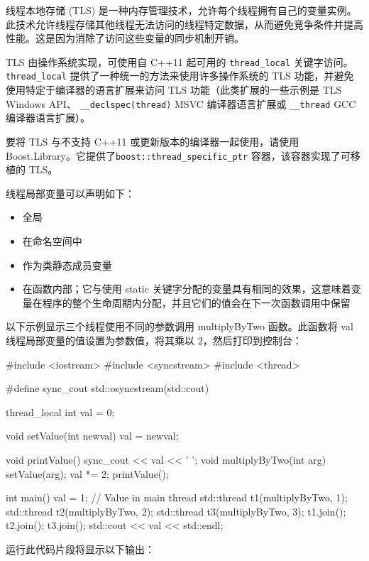 
线程本地存储 (TLS) 是一种内存管理技术，允许每个线程拥有自己的变量实例。此技术允许线程存储其他线程无法访问的线程特定数据，从而避免竞争条件并提高性能。这是因为消除了访问这些变量的同步机制开销。

TLS 由操作系统实现，可使用自 C++11 起可用的 \verb|thread_local| 关键字访问。 \verb|thread_local| 提供了一种统一的方法来使用许多操作系统的 TLS 功能，并避免使用特定于编译器的语言扩展来访问 TLS 功能（此类扩展的一些示例是 TLS Windows API、 \verb|__declspec(thread)| MSVC 编译器语言扩展或 \verb|__thread| GCC 编译器语言扩展）。

要将 TLS 与不支持 C++11 或更新版本的编译器一起使用，请使用 Boost.Library。它提供了\verb|boost::thread_specific_ptr| 容器，该容器实现了可移植的 TLS。

线程局部变量可以声明如下：

\begin{itemize}
\item
全局

\item
在命名空间中

\item
作为类静态成员变量

\item
在函数内部；它与使用 static 关键字分配的变量具有相同的效果，这意味着变量在程序的整个生命周期内分配，并且它们的值会在下一次函数调用中保留
\end{itemize}

以下示例显示三个线程使用不同的参数调用 multiplyByTwo 函数。此函数将 val 线程局部变量的值设置为参数值，将其乘以 2，然后打印到控制台：

\begin{cpp}
#include <iostream>
#include <syncstream>
#include <thread>

#define sync_cout std::osyncstream(std::cout)

thread_local int val = 0;

void setValue(int newval) { val = newval; }

void printValue() { sync_cout << val << ' '; }
void multiplyByTwo(int arg) {
    setValue(arg);
    val *= 2;
    printValue();
}

int main() {
    val = 1; // Value in main thread
    std::thread t1(multiplyByTwo, 1);
    std::thread t2(multiplyByTwo, 2);
    std::thread t3(multiplyByTwo, 3);
    t1.join();
    t2.join();
    t3.join();
    std::cout << val << std::endl;
}
\end{cpp}

运行此代码片段将显示以下输出：

